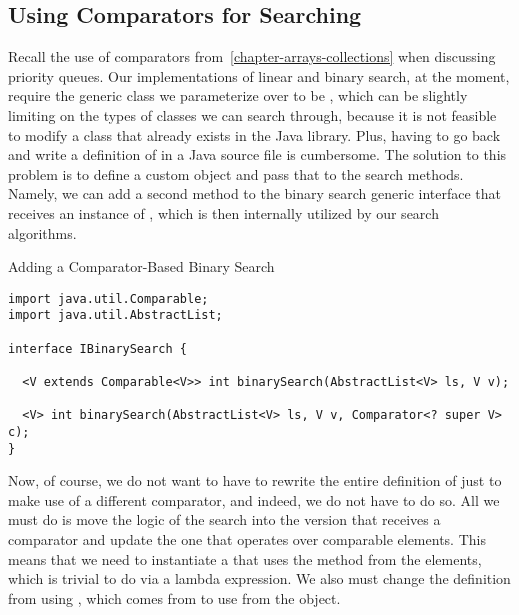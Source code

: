 \subsection*{Using Comparators for Searching}
Recall the use of comparators from~\ref{chapter-arrays-collections} when discussing priority queues. Our implementations of linear and binary search, at the moment, require the generic class we parameterize over to be , which can be slightly limiting on the types of classes we can search through, because it is not feasible to modify a class that already exists in the Java library. Plus, having to go back and write a definition of  in a Java source file is cumbersome. The solution to this problem is to define a custom  object and pass that to the search methods. Namely, we can add a second method to the binary search generic interface that receives an instance of , which is then internally utilized by our search algorithms. 


\begin{cl}{Adding a Comparator-Based Binary Search}
\begin{lstlisting}[language=MyJava]
import java.util.Comparable;
import java.util.AbstractList;

interface IBinarySearch {

  <V extends Comparable<V>> int binarySearch(AbstractList<V> ls, V v);

  <V> int binarySearch(AbstractList<V> ls, V v, Comparator<? super V> c);
}
\end{lstlisting}
\end{cl}

Now, of course, we do not want to have to rewrite the entire definition of  just to make use of a different comparator, and indeed, we do not have to do so. All we must do is move the logic of the search into the version that receives a comparator and update the one that operates over comparable elements. This means that we need to instantiate a  that uses the  method from the elements, which is trivial to do via a lambda expression. We also must change the definition from using , which comes from  to use  from the  object.

